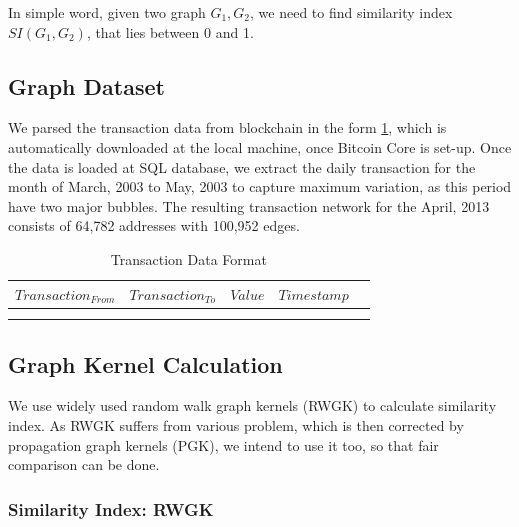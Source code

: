 In simple word, given two graph $G_{1}, G_{2}$, we need to find similarity index $SI(G_{1}, G_{2})$, that lies between 0 and 1.

\subsection{Graph Dataset}

We parsed the transaction data from blockchain in the form \ref{table:TD}, which is automatically downloaded at the local machine, once Bitcoin Core is set-up. Once the data is loaded at SQL database, we extract the daily transaction for the month of March, 2003 to May, 2003 to capture maximum variation, as this period have two major bubbles. The resulting transaction network for the April, 2013 consists of 64,782 addresses with 100,952 edges.

\begin{center}
\begin{table}[ht]
\caption{Transaction Data Format} %
\centering %
\begin{tabular}{c c c c c} %
\hline\hline %
$Transaction_{From}$ & $Transaction_{To}$ & $Value$ & $Timestamp$\\ [0.5ex] %
\hline %
 &  &  & \\ %
 &  &  &  \\ [1ex] %
\hline %
\end{tabular}
\label{table:TD} %
\end{table}
\end{center}

\subsection{Graph Kernel Calculation}

We use widely used random walk graph kernels (RWGK) to calculate similarity index. As RWGK suffers from various problem, which is then corrected by propagation graph kernels (PGK), we intend to use it too, so that fair comparison can be done. 

\subsubsection{Similarity Index: RWGK}

